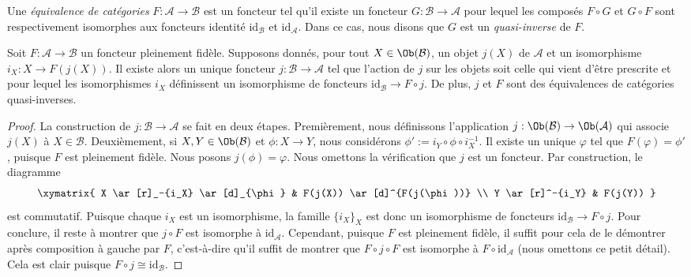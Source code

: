 \begin{definition}
\label{definition-equivalence-categories}
Une {\it équivalence de catégories}
$F : \mathcal{A} \to \mathcal{B}$ est un foncteur tel qu'il existe
un foncteur $G : \mathcal{B} \to \mathcal{A}$ pour lequel
les composés $F \circ G$ et $G \circ F$ sont respectivement isomorphes aux
foncteurs identité $\text{id}_\mathcal{B}$ et
$\text{id}_\mathcal{A}$.
Dans ce cas, nous disons que $G$ est un {\it quasi-inverse} de $F$.
\end{definition}

\begin{lemma}
\label{lemma-construct-quasi-inverse}
Soit $F : \mathcal{A} \to \mathcal{B}$ un foncteur pleinement fidèle.
Supposons donnés, pour tout $X \in \Ob(\mathcal{B})$, un
objet $j(X)$ de $\mathcal{A}$ et un isomorphisme $i_X : X \to F(j(X))$.
Il existe alors un unique foncteur $j : \mathcal{B} \to \mathcal{A}$
tel que l'action de $j$ sur les objets soit celle qui vient d'être prescrite et
pour lequel les isomorphismes
$i_X$ définissent un isomorphisme de foncteurs
$\text{id}_\mathcal{B} \to F \circ j$. De plus, $j$ et $F$
sont des équivalences de catégories quasi-inverses.
\end{lemma}

\begin{proof}
La construction de $j : \mathcal{B} \to \mathcal{A}$ se fait en deux étapes.
Premièrement, nous définissons l'application
$j : \Ob(\mathcal{B}) \to \Ob(\mathcal{A})$ qui associe
$j(X)$ à $X \in \mathcal{B}$. Deuxièmement, si
$X,Y \in \Ob(\mathcal{B})$ et $\phi : X \to Y$, nous considérons
$\phi' := i_Y \circ\phi\circ i_X^{-1}$. Il existe un unique
$\varphi$ tel que $F(\varphi) = \phi'$, puisque $F$ est pleinement fidèle.
Nous posons $j(\phi) = \varphi$. Nous omettons la vérification que $j$
est un foncteur. Par construction, le diagramme
$$
\xymatrix{
X \ar[r]_-{i_X} \ar[d]_{\phi}
&
F(j(X)) \ar[d]^{F(j(\phi))}
\\
Y \ar[r]^-{i_Y}
&
F(j(Y))
}
$$
est commutatif. Puisque chaque $i_X$ est un isomorphisme, la famille
$\{i_X\}_X$ est donc un isomorphisme de foncteurs
$\text{id}_\mathcal{B} \to F\circ j$. Pour conclure, il reste à montrer que
$j \circ F$ est isomorphe à $\text{id}_\mathcal{A}$.
Cependant, puisque $F$ est pleinement fidèle, il suffit pour cela de le
démontrer après composition à gauche par $F$, c'est-à-dire qu'il suffit de
montrer que $F \circ j \circ F$ est isomorphe à
$F \circ \text{id}_\mathcal{A}$
(nous omettons ce petit détail). Cela est clair puisque
$F \circ j \cong \text{id}_\mathcal{B}$.
\end{proof}

